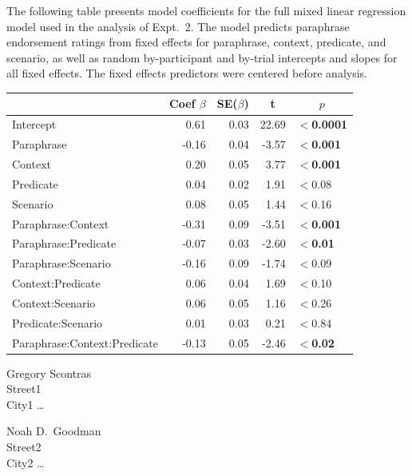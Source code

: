 \documentclass[linguex]{sp}
\begin{document}
The following table presents model coefficients for the full mixed linear regression model used in the analysis of Expt.~2. The model predicts paraphrase endorsement ratings from fixed effects for paraphrase, context, predicate, and scenario, as well as random by-participant and by-trial intercepts and slopes for all fixed effects. The fixed effects predictors were centered before analysis.

\begin{center}

\begin{tabular}{lrrrl}\toprule
	&	Coef $\beta$	&	SE($\beta$)	&	\multicolumn{1}{c}{ \textbf{t}}	&	\multicolumn{1}{c}{$p$}\\ \midrule
Intercept	&	0.61	&	0.03	&	22.69	&	\textbf{$<$0.0001}\\
Paraphrase	&	-0.16	&	0.04	&	-3.57	&	\textbf{$<$0.001}\\
Context		&	0.20	&	0.05	&	3.77	&	\textbf{$<$0.001}\\
Predicate	&	0.04	&	0.02	&	1.91	&	$<$0.08\\
Scenario	&	0.08	&	0.05	&	1.44	&	$<$0.16\\
Paraphrase:Context		&	-0.31	&	0.09	&	-3.51	&	\textbf{$<$0.001}\\
Paraphrase:Predicate	&	-0.07	&	0.03	&	-2.60	&	\textbf{$<$0.01}\\
Paraphrase:Scenario	&	-0.16	&	0.09	&	-1.74	&	$<$0.09\\
Context:Predicate	&	0.06	&	0.04	&	1.69	&	$<$0.10\\
Context:Scenario	&	0.06	&	0.05	&	1.16	&	$<$0.26\\
Predicate:Scenario	&	0.01	&	0.03	&	0.21	&	$<$0.84\\
Paraphrase:Context:Predicate	&	-0.13	&	0.05	&	-2.46	&	\textbf{$<$0.02}\\
\bottomrule
\end{tabular}

\end{center}


%


\begin{addresses}
	\begin{address}
		Gregory Scontras \\
		Street1 \\
		City1 \ldots \\
	\end{address}
	\begin{address}
		Noah D.~Goodman \\
		Street2 \\
		City2 \dots \\
		\email{author2@email}
	\end{address}
\end{addresses}
\end{document}
